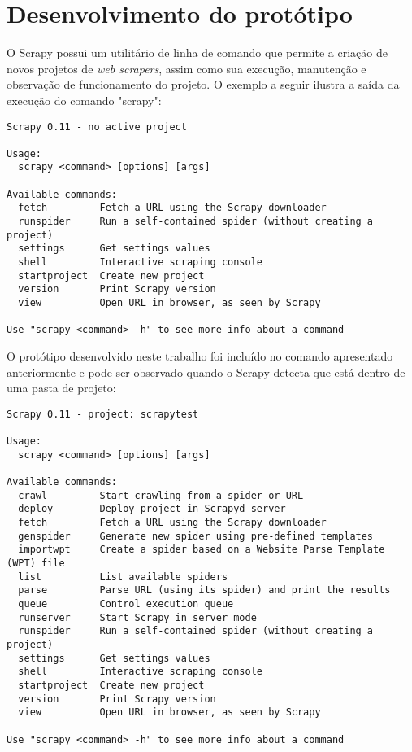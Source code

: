 \section{Desenvolvimento do protótipo}

O Scrapy possui um utilitário de linha de comando que permite a criação de novos projetos de \emph{web scrapers}, assim como sua execução, manutenção e observação de funcionamento do projeto. O exemplo a seguir ilustra a saída da execução do comando "scrapy":

\begin{lstlisting}
Scrapy 0.11 - no active project

Usage:
  scrapy <command> [options] [args]

Available commands:
  fetch         Fetch a URL using the Scrapy downloader
  runspider     Run a self-contained spider (without creating a project)
  settings      Get settings values
  shell         Interactive scraping console
  startproject  Create new project
  version       Print Scrapy version
  view          Open URL in browser, as seen by Scrapy

Use "scrapy <command> -h" to see more info about a command
\end{lstlisting}

O protótipo desenvolvido neste trabalho foi incluído no comando apresentado anteriormente e pode ser observado quando o Scrapy detecta que está dentro de uma pasta de projeto:

\pagebreak
{}
\begin{lstlisting}
Scrapy 0.11 - project: scrapytest

Usage:
  scrapy <command> [options] [args]

Available commands:
  crawl         Start crawling from a spider or URL
  deploy        Deploy project in Scrapyd server
  fetch         Fetch a URL using the Scrapy downloader
  genspider     Generate new spider using pre-defined templates
  importwpt     Create a spider based on a Website Parse Template (WPT) file
  list          List available spiders
  parse         Parse URL (using its spider) and print the results
  queue         Control execution queue
  runserver     Start Scrapy in server mode
  runspider     Run a self-contained spider (without creating a project)
  settings      Get settings values
  shell         Interactive scraping console
  startproject  Create new project
  version       Print Scrapy version
  view          Open URL in browser, as seen by Scrapy

Use "scrapy <command> -h" to see more info about a command

\end{lstlisting}

